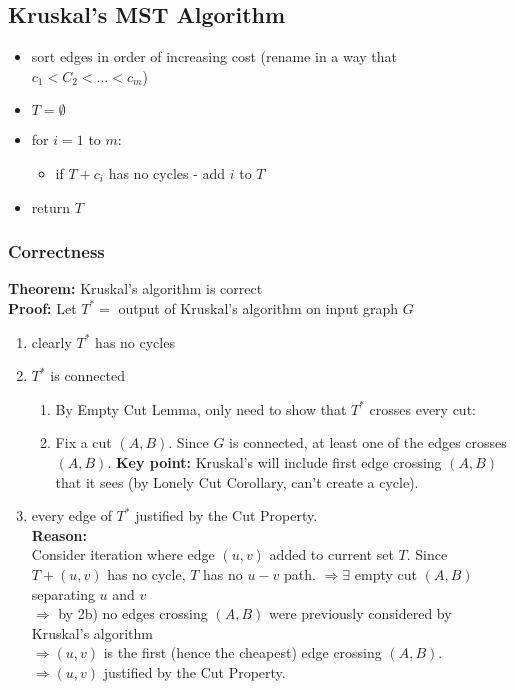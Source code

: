 \documentclass{scrartcl}
\begin{document}
\subsection{Kruskal's MST Algorithm}
\label{sec:6-1}
\begin{itemize}
\item sort edges in order of increasing cost (rename in a way that $c_1 < C_2 <
  \dots < c_m$)
\item $T = \emptyset$
\item for $i = 1$ to $m$:
  \begin{itemize}
  \item if $T + c_i$ has no cycles - add $i$ to $T$
  \end{itemize}
\item return $T$
\end{itemize}
\subsubsection{Correctness}
\label{sec:6-2}
{\bf Theorem: } Kruskal's algorithm is correct \\
{\bf Proof: } Let $T^* = $ output of Kruskal's algorithm on input graph $G$ \\
\begin{enumerate}
\item clearly $T^*$ has no cycles
\item $T^*$ is connected
  \begin{enumerate}
  \item By Empty Cut Lemma, only need to show that $T^*$ crosses every cut:
  \item Fix a cut $(A, B)$. Since $G$ is connected, at least one of the edges
    crosses $(A, B)$. {\bf Key point: } Kruskal's will include first edge
    crossing $(A, B)$ that it sees (by Lonely Cut Corollary, can't create a
    cycle).
  \end{enumerate}
\item every edge of $T^*$ justified by the Cut Property. \\
  {\bf Reason: }  \\
  Consider iteration where edge $(u, v)$ added to current set $T$. Since $T +
  (u, v)$ has no cycle, $T$ has no $u-v$ path. $\Rightarrow \exists$ empty cut
  $(A, B)$ separating $u$ and $v$ \\
  $\Rightarrow$ by 2b) no edges crossing $(A, B)$ were previously considered by
  Kruskal's algorithm \\
  $\Rightarrow (u, v)$ is the first (hence the cheapest) edge crossing $(A, B)$.
  $\Rightarrow (u, v)$ justified by the Cut Property.
\end{enumerate}
\end{document}
